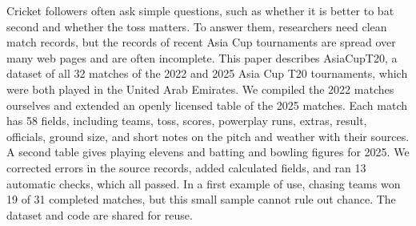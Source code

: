 Cricket followers often ask simple questions, such as whether it is better to bat second and whether the toss matters. To answer them, researchers need clean match records, but the records of recent Asia Cup tournaments are spread over many web pages and are often incomplete. This paper describes AsiaCupT20, a dataset of all 32 matches of the 2022 and 2025 Asia Cup T20 tournaments, which were both played in the United Arab Emirates. We compiled the 2022 matches ourselves and extended an openly licensed table of the 2025 matches. Each match has 58 fields, including teams, toss, scores, powerplay runs, extras, result, officials, ground size, and short notes on the pitch and weather with their sources. A second table gives playing elevens and batting and bowling figures for 2025. We corrected errors in the source records, added calculated fields, and ran 13 automatic checks, which all passed. In a first example of use, chasing teams won 19 of 31 completed matches, but this small sample cannot rule out chance. The dataset and code are shared for reuse.
